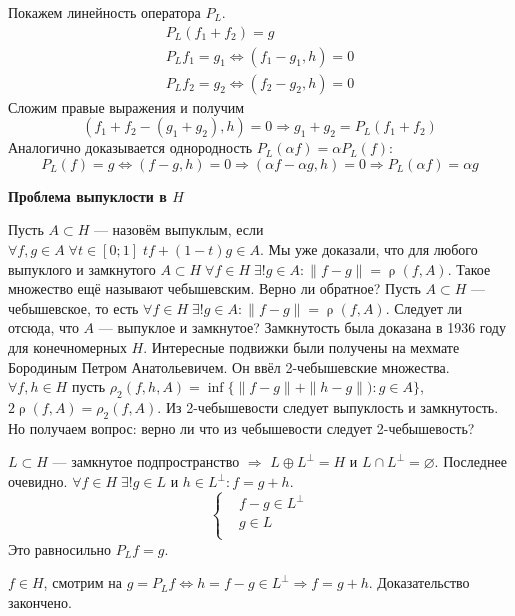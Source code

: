 \documentclass[14pt]{extarticle}
\DeclareMathOperator{\rh}{\rho}
\begin{document}
Покажем линейность оператора $P_L$.
\begin{gather*}
    P_L(f_1 + f_2) = g\\
    P_Lf_1 = g_1 \Leftrightarrow (f_1 - g_1, h) = 0\\
    P_Lf_2 = g_2 \Leftrightarrow (f_2 - g_2, h) = 0
\end{gather*}
Сложим правые выражения и получим
$$
(f_1 + f_2 - (g_1 + g_2), h) = 0 \Rightarrow g_1 + g_2 = P_L(f_1 + f_2)
$$
Аналогично доказывается однородность $P_L(\alpha f) = \alpha P_L(f)$: 
$$
P_L(f) = g \Leftrightarrow (f - g, h) = 0\Rightarrow (\alpha f - \alpha g, h) = 0\Rightarrow P_L(\alpha f) = \alpha g
$$

\textbf{Проблема выпуклости в $H$}

Пусть $A \subset H$ --- назовём выпуклым, если $\forall f,g \in A\;\forall t \in [0;1]\;t f + (1 - t) g \in A$.
Мы уже доказали, что для любого выпуклого и замкнутого $A \subset H\;\forall f \in H\;\exists! g \in A\colon \|f - g\| = \rh(f, A)$.
Такое множество ещё называют чебышевским.
Верно ли обратное? Пусть $A \subset H$ --- чебышевское, то есть $\forall f \in H\;\exists! g \in A\colon \|f - g\| = \rh(f,A)$. 
Следует ли отсюда, что $A$ --- выпуклое и замкнутое?
Замкнутость была доказана в 1936 году для конечномерных $H$.
Интересные подвижки были получены на мехмате Бородиным Петром Анатольевичем.
Он ввёл 2-чебышевские множества.
$\forall f,h \in H$ пусть $\rho_2(f, h, A) = \inf\{\|f - g\| + \|h - g\|):g \in A\}$, $2\rh(f, A) = \rho_2(f, A)$.
Из 2-чебышевости следует выпуклость и замкнутость.
Но получаем вопрос: верно ли что из чебышевости следует 2-чебышевость?

\begin{Theor}
    $L \subset H$ --- замкнутое подпространство $\Rightarrow$ $L \oplus L^\perp = H$ и $L \cap L^\perp = \varnothing$.
    Последнее очевидно. 
    $\forall f \in H\;\exists! g \in L$ и $h \in L^\perp\colon f = g + h$.
    $$
    \left\{
        \begin{aligned}
            &f - g \in L^\perp\\
            &g \in L\\
        \end{aligned}
    \right.
    $$
    Это равносильно $P_Lf = g$.
\end{Theor}
\begin{Proof}
$f \in H$, смотрим на $g = P_Lf \Leftrightarrow h = f - g \in L^\perp\Rightarrow f = g + h$.
Доказательство закончено.
\end{Proof}
\end{document}
